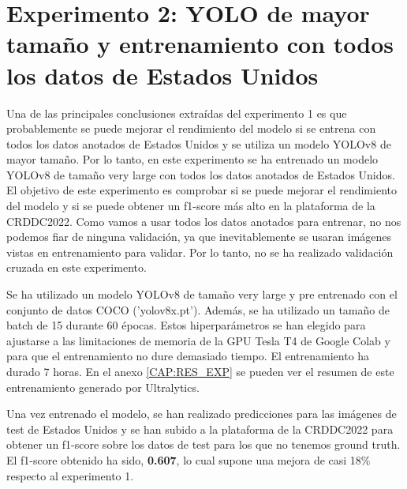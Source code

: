 \section{Experimento 2: YOLO de mayor tamaño y entrenamiento con todos los datos de Estados Unidos}\label{SEC:EXP2}

Una de las principales conclusiones extraídas del experimento 1 es que probablemente se puede mejorar el rendimiento del modelo si se entrena con todos los datos anotados de Estados Unidos y se utiliza un modelo YOLOv8 de mayor tamaño. Por lo tanto, en este experimento se ha entrenado un modelo YOLOv8 de tamaño very large con todos los datos anotados de Estados Unidos. El objetivo de este experimento es comprobar si se puede mejorar el rendimiento del modelo y si se puede obtener un f1-score más alto en la plataforma de la CRDDC2022. Como vamos a usar todos los datos anotados para entrenar, no nos podemos fiar de ninguna validación, ya que inevitablemente se usaran imágenes vistas en entrenamiento para validar. Por lo tanto, no se ha realizado validación cruzada en este experimento.

Se ha utilizado un modelo YOLOv8 de tamaño very large y pre entrenado con el conjunto de datos COCO ('yolov8x.pt'). Además, se ha utilizado un tamaño de batch de 15 durante 60 épocas. Estos hiperparámetros se han elegido para ajustarse a las limitaciones de memoria de la GPU Tesla T4 de Google Colab y para que el entrenamiento no dure demasiado tiempo. El entrenamiento ha durado 7 horas. En el anexo \ref{CAP:RES_EXP} se pueden ver el resumen de este entrenamiento generado por Ultralytics.

Una vez entrenado el modelo, se han realizado predicciones para las imágenes de test de Estados Unidos y se han subido a la plataforma de la CRDDC2022 para obtener un f1-score sobre los datos de test para los que no tenemos ground truth. El f1-score obtenido ha sido, \textbf{0.607}, lo cual supone una mejora de casi 18\% respecto al experimento 1.